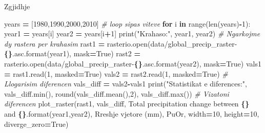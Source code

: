 \documentclass[
  ignorenonframetext,
]{beamer}
\newenvironment{Shaded}{\begin{snugshade}}{\end{snugshade}}
\newcommand{\BuiltInTok}[1]{#1}
\newcommand{\CommentTok}[1]{\textcolor[rgb]{0.56,0.35,0.01}{\textit{#1}}}
\newcommand{\ControlFlowTok}[1]{\textcolor[rgb]{0.13,0.29,0.53}{\textbf{#1}}}
\newcommand{\DecValTok}[1]{\textcolor[rgb]{0.00,0.00,0.81}{#1}}
\newcommand{\KeywordTok}[1]{\textcolor[rgb]{0.13,0.29,0.53}{\textbf{#1}}}
\newcommand{\NormalTok}[1]{#1}
\newcommand{\OperatorTok}[1]{\textcolor[rgb]{0.81,0.36,0.00}{\textbf{#1}}}
\newcommand{\SpecialCharTok}[1]{\textcolor[rgb]{0.81,0.36,0.00}{\textbf{#1}}}
\newcommand{\StringTok}[1]{\textcolor[rgb]{0.31,0.60,0.02}{#1}}
\newcommand{\VariableTok}[1]{\textcolor[rgb]{0.00,0.00,0.00}{#1}}
\begin{document}
\begin{frame}[fragile]{Zgjidhje}
\protect\hypertarget{zgjidhje-3}{}

\begin{Shaded}
\begin{Highlighting}[]
\NormalTok{years }\OperatorTok{=}\NormalTok{ [}\DecValTok{1980}\NormalTok{,}\DecValTok{1990}\NormalTok{,}\DecValTok{2000}\NormalTok{,}\DecValTok{2010}\NormalTok{]}
\CommentTok{\# loop sipas viteve}
\ControlFlowTok{for}\NormalTok{ i }\KeywordTok{in} \BuiltInTok{range}\NormalTok{(}\BuiltInTok{len}\NormalTok{(years)}\OperatorTok{{-}}\DecValTok{1}\NormalTok{):}
\NormalTok{    year1 }\OperatorTok{=}\NormalTok{ years[i]}
\NormalTok{    year2 }\OperatorTok{=}\NormalTok{ years[i}\OperatorTok{+}\DecValTok{1}\NormalTok{]}
    \BuiltInTok{print}\NormalTok{(}\StringTok{"Krahaso:"}\NormalTok{, year1, year2)}
    \CommentTok{\# Ngarkojme dy rastera per krahasim}
\NormalTok{    rast1 }\OperatorTok{=}\NormalTok{ rasterio.}\BuiltInTok{open}\NormalTok{(}\StringTok{\textquotesingle{}data/global\_precip\_raster{-}}\SpecialCharTok{\{\}}\StringTok{.asc\textquotesingle{}}\NormalTok{.}\BuiltInTok{format}\NormalTok{(year1), mask}\OperatorTok{=}\VariableTok{True}\NormalTok{)}
\NormalTok{    rast2 }\OperatorTok{=}\NormalTok{ rasterio.}\BuiltInTok{open}\NormalTok{(}\StringTok{\textquotesingle{}data/global\_precip\_raster{-}}\SpecialCharTok{\{\}}\StringTok{.asc\textquotesingle{}}\NormalTok{.}\BuiltInTok{format}\NormalTok{(year2), mask}\OperatorTok{=}\VariableTok{True}\NormalTok{)}
\NormalTok{    vals1 }\OperatorTok{=}\NormalTok{ rast1.read(}\DecValTok{1}\NormalTok{, masked}\OperatorTok{=}\VariableTok{True}\NormalTok{)}
\NormalTok{    vals2 }\OperatorTok{=}\NormalTok{ rast2.read(}\DecValTok{1}\NormalTok{, masked}\OperatorTok{=}\VariableTok{True}\NormalTok{)}
    \CommentTok{\# Llogarisim diferencen}
\NormalTok{    vals\_diff }\OperatorTok{=}\NormalTok{ vals2}\OperatorTok{{-}}\NormalTok{vals1}
    \BuiltInTok{print}\NormalTok{(}\StringTok{"Statistikat e diferences:"}\NormalTok{, vals\_diff.}\BuiltInTok{min}\NormalTok{(), }\BuiltInTok{round}\NormalTok{(vals\_diff.mean(),}\DecValTok{2}\NormalTok{), vals\_diff.}\BuiltInTok{max}\NormalTok{())}
    \CommentTok{\# Vizatoni diferencen}
\NormalTok{    plot\_raster(rast1, vals\_diff, }\StringTok{\textquotesingle{}Total precipitation change between }\SpecialCharTok{\{\}}\StringTok{ and }\SpecialCharTok{\{\}}\StringTok{\textquotesingle{}}\NormalTok{.}\BuiltInTok{format}\NormalTok{(year1,year2), }
            \StringTok{\textquotesingle{}Rreshje vjetore (mm)\textquotesingle{}}\NormalTok{, }\StringTok{\textquotesingle{}PuOr\textquotesingle{}}\NormalTok{, width}\OperatorTok{=}\DecValTok{10}\NormalTok{, height}\OperatorTok{=}\DecValTok{10}\NormalTok{, diverge\_zero}\OperatorTok{=}\VariableTok{True}\NormalTok{)}
\end{Highlighting}
\end{Shaded}
\end{frame}
\end{document}
